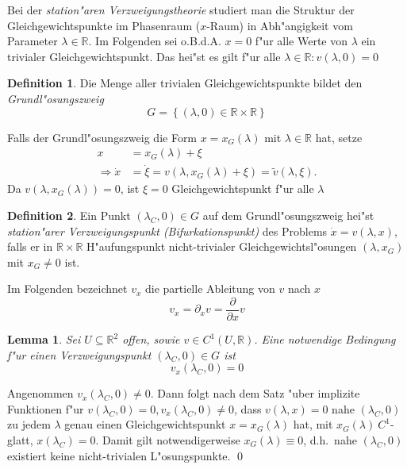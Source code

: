 \documentclass[a4paper, 13pt]{scrreprt}
\newtheorem{lemma}[theorem]{Lemma}
\theoremstyle{definition} \newtheorem{definition}{Definition}[section]
\newenvironment{beweis}[1][Beweis]{\begin{trivlist}
\item[\hskip \labelsep {\bfseries #1}]}{\end{trivlist}}
\newcommand{\RR}{\mathbb{R}}
\begin{document}
Bei der \emph{station"aren Verzweigungstheorie} studiert man die Struktur der Gleichgewichtspunkte im Phasenraum ($x$-Raum) in Abh"angigkeit vom Parameter $\lambda\in\RR$.
Im Folgenden sei o.B.d.A. $x=0$ f"ur alle Werte von $\lambda$ ein trivialer Gleichgewichtspunkt. Das hei"st es gilt f"ur alle $\lambda \in \RR: v(\lambda, 0) = 0$
\begin{definition}
Die Menge aller trivialen Gleichgewichtspunkte bildet den \emph{Grundl"osungszweig}
$$ G= \left \{ (\lambda, 0) \in \RR \times \RR \right \}$$
\end{definition}

Falls der Grundl"osungszweig die Form $x=x_G(\lambda)$ mit $\lambda\in\RR$ hat, setze
\begin{align*}
x &=x_G(\lambda)+\xi\\
\Rightarrow\dot x &= \dot\xi = v(\lambda,x_G(\lambda)+\xi) = \tilde v(\lambda,\xi).
\end{align*}
Da $v(\lambda, x_G(\lambda)) = 0$, ist $\xi = 0$ Gleichgewichtspunkt f"ur alle $\lambda$

\begin{definition}
Ein Punkt $(\lambda_C,0) \in G$ auf dem Grundl"osungszweig hei"st \emph{station"arer Verzweigungspunkt (Bifurkationspunkt)} des Problems $\dot x = v(\lambda, x)$, falls er in $\RR\times\RR$ H"aufungspunkt nicht-trivialer Gleichgewichtsl"osungen $(\lambda,x_G)$ mit ${x_G\neq 0}$ ist.
\end{definition}
Im Folgenden bezeichnet $v_x$ die partielle Ableitung von $v$ nach $x$
$$ v_x = \partial_x v = \frac{\partial}{\partial x} v$$
\begin{lemma}
Sei $U\subseteq \RR^2$ offen, sowie $v \in C^1(U, \RR)$. Eine notwendige Bedingung f"ur einen  Verzweigungspunkt $(\lambda_C, 0)\in G$ ist
\[
v_x(\lambda_C,0) = 0
\]
\end{lemma}

\begin{beweis}
Angenommen $v_x(\lambda_C,0)\neq 0$. Dann folgt nach dem Satz "uber implizite Funktionen f"ur \(v(\lambda_C,0)=0, v_x(\lambda_C,0) \not= 0\), dass \(v(\lambda,x)=0\) nahe \((\lambda_C,0)\) zu jedem \(\lambda\) genau einen Gleichgewichtspunkt \(x=x_G(\lambda)\) hat, mit \(x_G(\lambda)\ C^1\)-glatt, \(x(\lambda_C)=0\).
 Damit gilt notwendigerweise $x_G(\lambda)\equiv 0$, d.h.\ nahe $(\lambda_C,0)$ existiert keine nicht-trivialen L"osungspunkte.
 \qed
\end{beweis}
\end{document}
